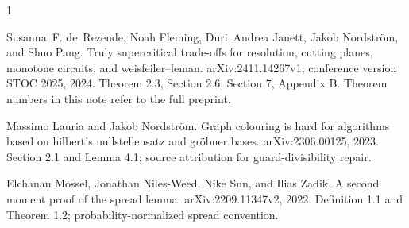 \documentclass[11pt]{article}
\begin{document}
\begin{thebibliography}{1}

Susanna~F. de~Rezende, Noah Fleming, Duri~Andrea Janett, Jakob Nordstr{\"o}m,
  and Shuo Pang.
\newblock Truly supercritical trade-offs for resolution, cutting planes,
  monotone circuits, and weisfeiler--leman.
\newblock arXiv:2411.14267v1; conference version STOC 2025, 2024.
\newblock Theorem 2.3, Section 2.6, Section 7, Appendix B. Theorem numbers in
  this note refer to the full preprint.

Massimo Lauria and Jakob Nordstr{\"o}m.
\newblock Graph colouring is hard for algorithms based on hilbert's
  nullstellensatz and gr{\"o}bner bases.
\newblock arXiv:2306.00125, 2023.
\newblock Section 2.1 and Lemma 4.1; source attribution for guard-divisibility
  repair.

Elchanan Mossel, Jonathan Niles-Weed, Nike Sun, and Ilias Zadik.
\newblock A second moment proof of the spread lemma.
\newblock arXiv:2209.11347v2, 2022.
\newblock Definition 1.1 and Theorem 1.2; probability-normalized spread
  convention.

\end{thebibliography}
\end{document}
